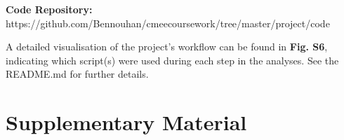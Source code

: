 \documentclass[11pt]{article}
\begin{document}
\textbf{Code Repository:} \\
https://github.com/Bennouhan/cmeecoursework/tree/master/project/code


\vspace{4mm}

\noindent
A detailed visualisation of the project's workflow can be found in \textbf{Fig. S6}, indicating which script(s) were used during each step in the analyses. See the README.md for further details.


\newpage
\printbibliography[heading=bibintoc]










\newpage
\section*{Supplementary Material} %
\renewcommand{\thefigure}{S\arabic{figure}}
\setcounter{figure}{0} 

\end{document}
